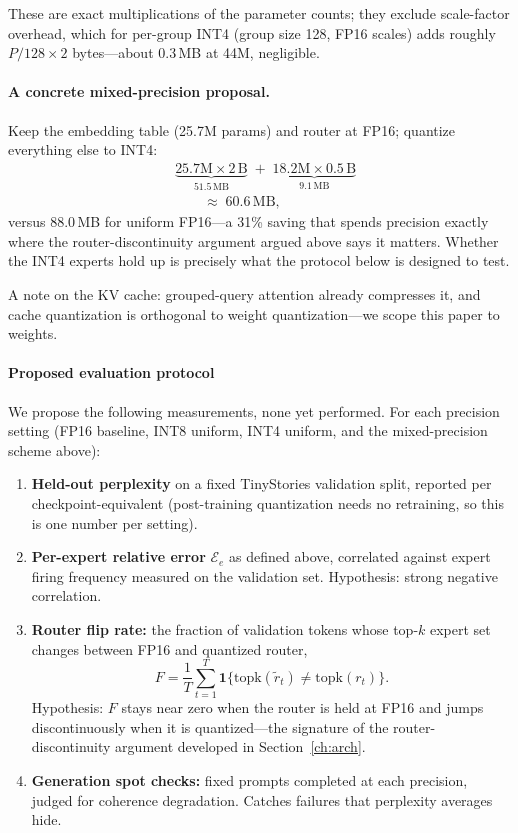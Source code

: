 These are exact multiplications of the parameter counts; they exclude
scale-factor overhead, which for per-group INT4 (group size 128, FP16
scales) adds roughly $P/128 \times 2$ bytes---about 0.3\,MB at 44M,
negligible.

\paragraph{A concrete mixed-precision proposal.} Keep the embedding
table (25.7M params) and router at FP16; quantize everything else to
INT4:
{\small
\begin{equation}
\begin{aligned}
&\underbrace{25.7\text{M} \times 2\,\text{B}}_{51.5\,\text{MB}}
\;+\;
\underbrace{18.2\text{M} \times 0.5\,\text{B}}_{9.1\,\text{MB}} \\
&\qquad\approx\; 60.6\,\text{MB},
\end{aligned}
\end{equation}}
versus 88.0\,MB for uniform FP16---a 31\% saving that spends precision
exactly where the router-discontinuity argument
argued above says it matters. Whether the INT4
experts hold up is precisely what the protocol below is designed to
test.

A note on the KV cache: grouped-query attention already compresses it,
and cache quantization is orthogonal to weight quantization---we scope
this paper to weights.

\paragraph{Proposed evaluation protocol}

We propose the following measurements, none yet performed. For each
precision setting (FP16 baseline, INT8 uniform, INT4 uniform, and the
mixed-precision scheme above):

\begin{enumerate}
\item \textbf{Held-out perplexity} on a fixed TinyStories validation
split, reported per checkpoint-equivalent (post-training quantization
needs no retraining, so this is one number per setting).
\item \textbf{Per-expert relative error} $\mathcal{E}_e$ as defined
above, correlated against expert firing frequency measured on
the validation set. Hypothesis: strong negative correlation.
\item \textbf{Router flip rate:} the fraction of validation tokens
whose top-$k$ expert set changes between FP16 and quantized router,
\begin{equation}
F = \frac{1}{T}\sum_{t=1}^{T}
\mathbf{1}\{\mathrm{topk}(\tilde{r}_t) \neq \mathrm{topk}(r_t)\}.
\end{equation}
Hypothesis: $F$ stays near zero when the router is held at FP16 and
jumps discontinuously when it is quantized---the signature of the
router-discontinuity argument developed in Section~\ref{ch:arch}.
\item \textbf{Generation spot checks:} fixed prompts completed at each
precision, judged for coherence degradation. Catches failures that
perplexity averages hide.
\end{enumerate}


